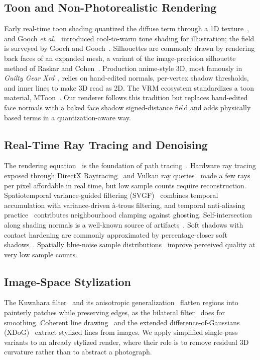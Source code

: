 \documentclass[conference]{IEEEtran}
\begin{document}
\subsection{Toon and Non-Photorealistic Rendering}
Early real-time toon shading quantized the diffuse term through a 1D texture~\cite{lake}, and Gooch \textit{et al.}~\cite{gooch98} introduced cool-to-warm tone shading for illustration; the field is surveyed by Gooch and Gooch~\cite{npr_book}. Silhouettes are commonly drawn by rendering back faces of an expanded mesh, a variant of the image-precision silhouette method of Raskar and Cohen~\cite{raskar}. Production anime-style 3D, most famously in \textit{Guilty Gear Xrd}~\cite{ggxrd}, relies on hand-edited normals, per-vertex shadow thresholds, and inner lines to make 3D read as 2D. The VRM ecosystem standardizes a toon material, MToon~\cite{mtoon}. Our renderer follows this tradition but replaces hand-edited face normals with a baked face shadow signed-distance field and adds physically based terms in a quantization-aware way.


\subsection{Real-Time Ray Tracing and Denoising}
The rendering equation~\cite{kajiya86} is the foundation of path tracing~\cite{pbrt}. Hardware ray tracing exposed through DirectX Raytracing~\cite{dxr} and Vulkan ray queries~\cite{vulkan} made a few rays per pixel affordable in real time, but low sample counts require reconstruction. Spatiotemporal variance-guided filtering (SVGF)~\cite{svgf} combines temporal accumulation with variance-driven à-trous filtering, and temporal anti-aliasing practice~\cite{karis} contributes neighbourhood clamping against ghosting. Self-intersection along shading normals is a well-known source of artifacts~\cite{wachter}. Soft shadows with contact hardening are commonly approximated by percentage-closer soft shadows~\cite{pcss}. Spatially blue-noise sample distributions~\cite{heitz} improve perceived quality at very low sample counts.


\subsection{Image-Space Stylization}
The Kuwahara filter~\cite{kuwahara} and its anisotropic generalization~\cite{kyprianidis} flatten regions into painterly patches while preserving edges, as the bilateral filter~\cite{tomasi} does for smoothing. Coherent line drawing~\cite{kang} and the extended difference-of-Gaussians (XDoG)~\cite{xdog} extract stylized lines from images. We apply simplified single-pass variants to an already stylized render, where their role is to remove residual 3D curvature rather than to abstract a photograph.
\end{document}
